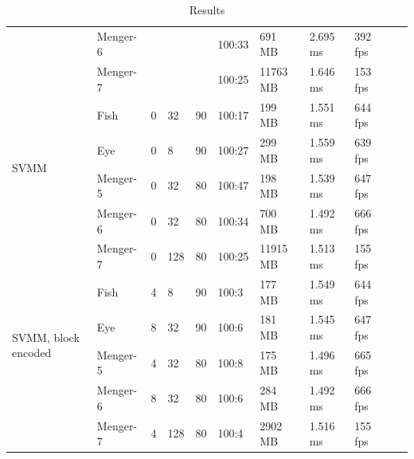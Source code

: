 \begin{table}[H]
\begin{tabular}{*{11}{l}}
                            & Menger-6       &                    &                  &                      & 100:33                & 691 MB           & 2.695 ms              & 392 fps \\
                            & Menger-7       &                    &                  &                      & 100:25                & 11763 MB       & 1.646 ms                & 153 fps \\
\midrule
\multirow{4}{*}{SVMM}
                            & Fish               & 0                 & 32             & 90                 & 100:17                 & 199 MB           & 1.551 ms               & 644 fps \\
                            & Eye                & 0                 & 8               & 90                 & 100:27                 & 299 MB           & 1.559 ms                   & 639 fps \\
                            & Menger-5       & 0                  & 32             & 80                & 100:47                 & 198 MB          & 1.539 ms               & 647 fps \\
                            & Menger-6       & 0                  & 32             & 80                & 100:34                 & 700 MB         & 1.492 ms              & 666 fps \\
                            & Menger-7       & 0                  & 128           & 80                & 100:25                 & 11915 MB       & 1.513 ms               & 155 fps \\
\midrule
\multirow{4}{*}{\begin{varwidth}{5em}SVMM, block encoded\end{varwidth}}
                            & Fish               & 4                 & 8               &90                  & 100:3                  & 177 MB           & 1.549 ms              & 644 fps \\
                            & Eye                &8                  &32              &90                  & 100:6                  & 181 MB          & 1.545 ms                & 647 fps \\
                            & Menger-5       &4                  &32              &80                  & 100:8                  & 175 MB          & 1.496 ms                & 665 fps \\
                            & Menger-6       &8                  &32              &80                  & 100:6                  & 284 MB          & 1.492 ms                & 666  fps \\
                            & Menger-7       &4                  &128            &80                  & 100:4                  & 2902 MB        & 1.516 ms                & 155 fps \\
\bottomrule
\end{tabular}
\caption{Results}
\label{tab:results}
\end{table}

